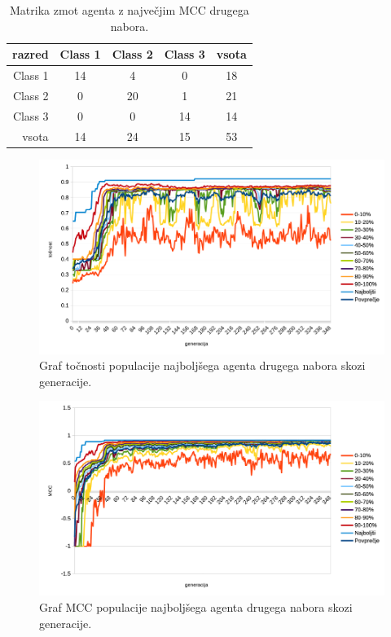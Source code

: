 \begin{table}[H]
    \centering
    \begin{tabular}{||rcccc||}
        \hline
        razred  & Class 1 & Class 2 & Class 3 & vsota \\ \hline
        Class 1 & 14      & 4       & 0       & 18    \\ \hline
        Class 2 & 0       & 20      & 1       & 21    \\ \hline
        Class 3 & 0       & 0       & 14      & 14    \\ \hline
        vsota   & 14      & 24      & 15      & 53    \\ \hline
    \end{tabular}
    \caption{Matrika zmot agenta z največjim MCC drugega nabora.}
    \label{tab:wine_mcc_2}
\end{table}

\begin{figure}[H]
    \begin{center}
        \includegraphics[width=13cm]{wine/2/acc}
    \end{center}
    \caption{Graf točnosti populacije najboljšega agenta drugega nabora skozi generacije.}
    \label{fig:wine_acc_2}
\end{figure}

\begin{figure}[H]
    \begin{center}
        \includegraphics[width=13cm]{wine/2/mcc}
    \end{center}
    \caption{Graf MCC populacije najboljšega agenta drugega nabora skozi generacije.}
    \label{fig:wine_mcc_2}
\end{figure}

